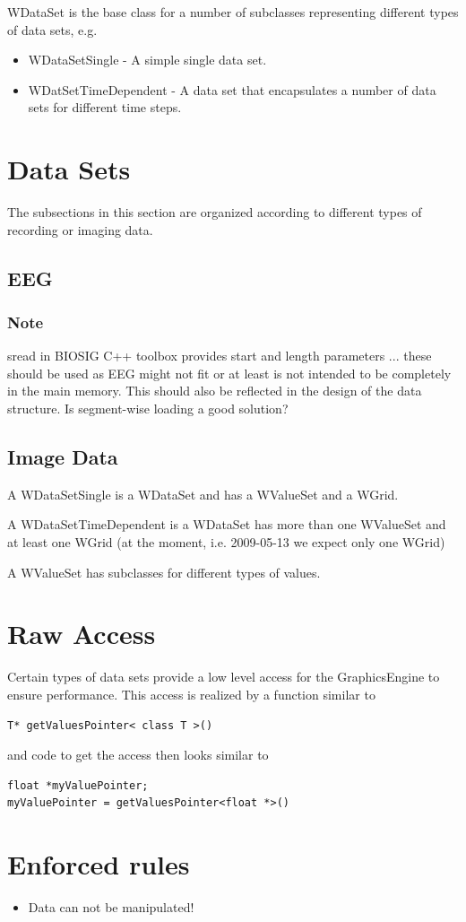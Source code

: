 \documentclass[a4paper,12pt]{scrbook}
\begin{document}
WDataSet is the base class for a number of subclasses representing different types of data sets, e.g.
\begin{itemize}
\item WDataSetSingle - A simple single data set.
\item WDatSetTimeDependent - A data set that encapsulates a number of data sets for different time steps.
\end{itemize}

\section{Data Sets}
The subsections in this section are organized according to different types of recording or imaging data.
\subsection{EEG}
\subsubsection{Note}
sread in BIOSIG C++ toolbox provides start and length parameters ... these should be used as EEG might not fit or at least is not
intended to be completely in the main memory. This should also be reflected in the design of the data structure.  Is segment-wise
loading a good solution?

\subsection{Image Data}

A WDataSetSingle is a WDataSet and has a WValueSet and a WGrid.

A WDataSetTimeDependent is a WDataSet has more than one WValueSet and at least one WGrid (at the moment, i.e. 2009-05-13 we expect
only one WGrid)

A WValueSet has subclasses for different types of values.

\section{Raw Access}
Certain types of data sets provide a low level access for the GraphicsEngine to ensure performance. This access is realized by a
function similar to
\begin{verbatim}
T* getValuesPointer< class T >()
\end{verbatim}
and code to get the access then looks similar to
\begin{verbatim}
float *myValuePointer;
myValuePointer = getValuesPointer<float *>()
\end{verbatim}

\section{Enforced rules}
\begin{itemize}
\item Data can not be manipulated!
\end{itemize}
 
\end{document}
